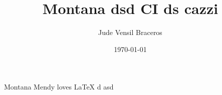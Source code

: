 \documentclass{article}
\title{Montana dsd  CI ds cazzi}
\author{Jude Vensil Braceros}
\date{\today}
\begin{document}
\maketitle

Montana Mendy loves LaTeX d asd
\end{document}
